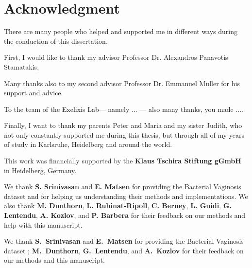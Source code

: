 \section*{Acknowledgment}
\vspace*{1em}

There are many people who helped and supported me in different ways during the conduction of this dissertation.

First, I would like to thank my advisor Professor Dr. Alexandros Panavotis Stamatakis,

Many thanks also to my second advisor Professor Dr. Emmanuel Müller for his support and advice.

To the team of the Exelixis Lab--- namely ... --- also many thanks, you made ....

Finally, I want to thank my parents Peter and Maria and my sister Judith,
who not only constantly supported me during this thesis,
but through all of my years of study in Karlsruhe, Heidelberg and around the world.


This work was financially supported by the \textbf{Klaus Tschira Stiftung gGmbH} in Heidelberg, Germany.

We thank \textbf{S. Srinivasan} and \textbf{E. Matsen}
for providing the Bacterial Vaginosis dataset \cite{Srinivasan2012}
and for helping us understanding their methods and implementations.
We also thank \textbf{M. Dunthorn}, \textbf{L. Rubinat-Ripoll}, \textbf{C. Berney}, \textbf{L. Guidi},
\textbf{G. Lentendu}, %
\textbf{A. Kozlov}, and \textbf{P. Barbera}
for their feedback on our methods and help with this manuscript.

We thank \textbf{S.~Srinivasan} and \textbf{E.~Matsen}
for providing the Bacterial Vaginosis dataset \citep{Srinivasan2012};
\textbf{M.~Dunthorn}, \textbf{G.~Lentendu}, %
and \textbf{A.~Kozlov}
for their feedback on our methods and this manuscript.




